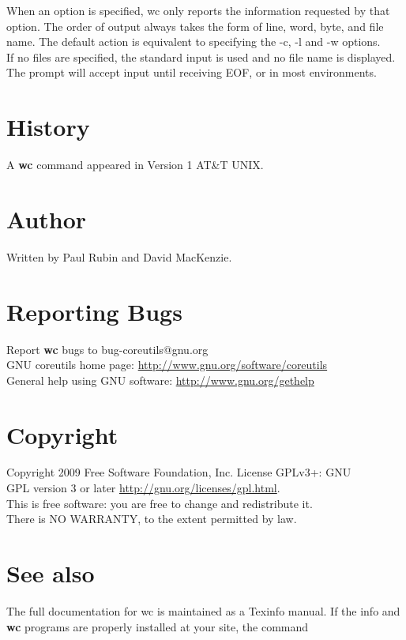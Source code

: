 \documentclass{article}
\begin{document}
When an option is specified, wc only reports the information requested by
that option.  The order of	output always takes the	form of	line, word,
byte, and file name.  The default action is equivalent to specifying the
-c, -l and	-w options.\\

If	no files are specified,	the standard input is used and no file name is
displayed.	 The prompt will accept	input until receiving EOF, or  in
most environments.

\section{History}
A \textbf{wc} command appeared in Version 1	AT\&T UNIX.

\section{Author}
Written by Paul Rubin and David MacKenzie.

\section{Reporting Bugs}
Report \textbf{wc} bugs to bug-coreutils@gnu.org\\
GNU coreutils home page: \underline{http://www.gnu.org/software/coreutils}\\
General help using GNU software: \underline{http://www.gnu.org/gethelp}\\

\section{Copyright}
Copyright 2009 Free Software Foundation, Inc.   License  GPLv3+:  GNU\\
GPL version 3 or later \underline{http://gnu.org/licenses/gpl.html}.\\
This  is  free  software:  you  are free to change and redistribute it.\\
There is NO WARRANTY, to the extent permitted by law.\\

\section{See also}
The full documentation for wc is maintained as a  Texinfo  manual.   If
the  info  and  \textbf{wc}  programs  are  properly installed at your site, the
command
\end{document}
